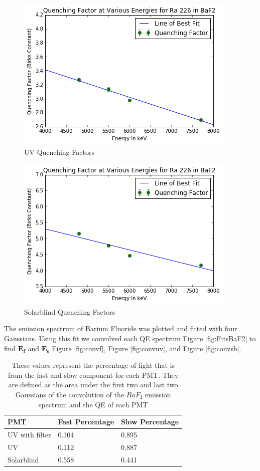 \documentclass[aip, jmp, amsmath, amssymb, reprint, floatfix]{revtex4-1}
\begin{document}
\begin{figure}
  \centering
    \includegraphics[width=.8\columnwidth]{qfuv.png}
  \caption{UV Quenching Factors}
  \label{fig:qfuv}
\end{figure} 

\begin{figure}
  \centering
    \includegraphics[width=.8\columnwidth]{qfsb.png}
  \caption{Solarblind Quenching Factors}
  \label{fig:qfsb}
\end{figure} 

The emission spectrum of Barium Fluoride was plotted and fitted with four Gaussians. Using this fit we convolved each QE spectrum Figure \ref{fig:FitsBaF2} to find $\bm{E_f}$ and $\bm{E_s}$ Figure \ref{fig:convf}, Figure \ref{fig:convuv}, and Figure \ref{fig:convsb}.

\begin{table}
    \begin{tabular}{ | l | l | p{2cm} |}
    \hline
    PMT & Fast Percentage & Slow Percentage\\ \hline

    UV with filter & 0.104 & 0.895\\ \hline  

    UV & 0.112 & 0.887\\ \hline

    Solarblind & 0.558 & 0.441\\ \hline
    \hline
    \end{tabular}
    \caption{These values represent the percentage of light that is from the fast and slow component for each PMT. They are defined as the area under the first two and last two Gaussians of the convolution of the $BaF_2$ emission spectrum and the QE of each PMT}
    \label{table:fastvsslow}
\end{table}
\end{document}
